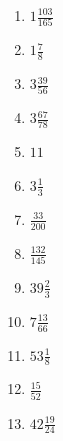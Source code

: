 \documentclass[12pt]{article}
\begin{document}
\begin{enumerate}
\item $ 1 \frac{103}{165} $
\item $ 1 \frac{7}{8} $
\item $ 3 \frac{39}{56} $
\item $ 3 \frac{67}{78} $
\item $ 11 $
\item $ 3 \frac{1}{3} $
\item $ \frac{33}{200} $
\item $ \frac{132}{145} $
\item $ 39 \frac{2}{3} $
\item $ 7 \frac{13}{66} $
\item $ 53 \frac{1}{8} $
\item $ \frac{15}{52} $
\item $ 42 \frac{19}{24} $
\end{enumerate}
\newpage
\end{document}
